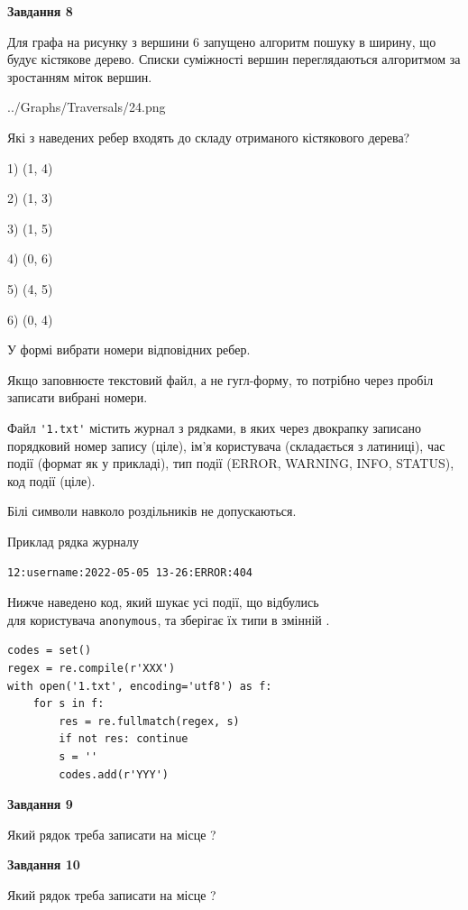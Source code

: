 \documentclass[12pt, ukrainian]{article}
\def\code#1{\Verb!#1!}
\begin{document}
{\begin {large}
{\begin {center}\textbf{Завдання 8}\end {center}}\par
Для графа на рисунку з вершини 6 запущено алгоритм пошуку в ширину, що будує кістякове дерево. Списки суміжності вершин переглядаються алгоритмом за зростанням міток вершин.\par
\begin{center}
	{../Graphs/Traversals/24.png}
\end{center}
\par Які з наведених ребер входять до складу отриманого кістякового дерева?\par
1) (1, 4)\par
2) (1, 3)\par
3) (1, 5)\par
4) (0, 6)\par
5) (4, 5)\par
6) (0, 4)\par
{\vskip 15pt} У формі вибрати номери відповідних ребер.


Якщо заповнюєте текстовий файл, а не гугл-форму, то потрібно через пробіл записа\-ти вибрані номери.\par
\newpage


Файл \code{'1.txt'} містить журнал з рядками, в яких через двокрапку записано поряд\-ко\-вий номер запису (ціле), ім'я користувача (складається з латиниці), час події (фор\-мат як у прикладі), тип події (ERROR, WARNING, INFO, STATUS), код події (ціле).

Білі символи навколо роздільників не допускаються.

Приклад рядка журналу



\begin{verbatim}
12:username:2022-05-05 13-26:ERROR:404
\end{verbatim}


Нижче наведено код, який шукає усі події, що відбулись\\ для користувача \code{anonymous}, та зберігає їх типи в змінній .



\begin{verbatim}
codes = set()
regex = re.compile(r'XXX')
with open('1.txt', encoding='utf8') as f:
    for s in f:
        res = re.fullmatch(regex, s)
        if not res: continue
        s = ''
        codes.add(r'YYY')
\end{verbatim}


{\begin {center}\textbf{Завдання 9}\end {center}}\par
Який рядок треба записати на місце  ?\par
\vspace{5mm}


{\begin {center}\textbf{Завдання 10}\end {center}}\par
Який рядок треба записати на місце  ?\par


\newpage


\end {large}}
\end{document}
